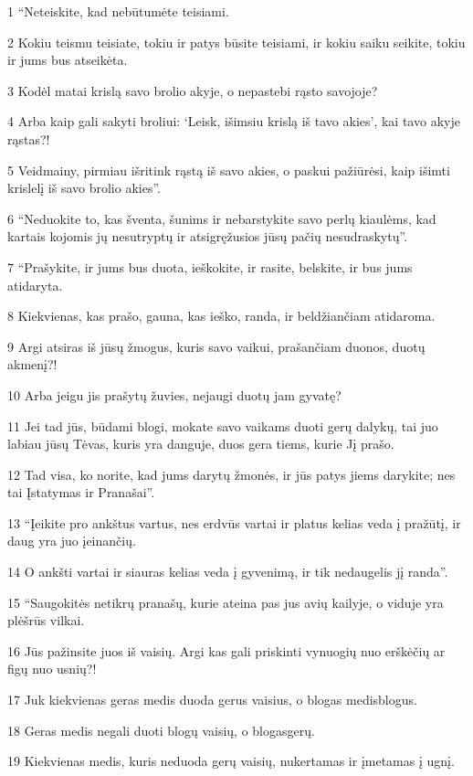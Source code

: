 \par 1 “Neteiskite, kad nebūtumėte teisiami. 
\par 2 Kokiu teismu teisiate, tokiu ir patys būsite teisiami, ir kokiu saiku seikite, tokiu ir jums bus atseikėta. 
\par 3 Kodėl matai krislą savo brolio akyje, o nepastebi rąsto savojoje? 
\par 4 Arba kaip gali sakyti broliui: ‘Leisk, išimsiu krislą iš tavo akies’, kai tavo akyje rąstas?! 
\par 5 Veidmainy, pirmiau išritink rąstą iš savo akies, o paskui pažiūrėsi, kaip išimti krislelį iš savo brolio akies”. 
\par 6 “Neduokite to, kas šventa, šunims ir nebarstykite savo perlų kiaulėms, kad kartais kojomis jų nesutryptų ir atsigręžusios jūsų pačių nesudraskytų”. 
\par 7 “Prašykite, ir jums bus duota, ieškokite, ir rasite, belskite, ir bus jums atidaryta. 
\par 8 Kiekvienas, kas prašo, gauna, kas ieško, randa, ir beldžiančiam atidaroma. 
\par 9 Argi atsiras iš jūsų žmogus, kuris savo vaikui, prašančiam duonos, duotų akmenį?! 
\par 10 Arba jeigu jis prašytų žuvies, nejaugi duotų jam gyvatę? 
\par 11 Jei tad jūs, būdami blogi, mokate savo vaikams duoti gerų dalykų, tai juo labiau jūsų Tėvas, kuris yra danguje, duos gera tiems, kurie Jį prašo. 
\par 12 Tad visa, ko norite, kad jums darytų žmonės, ir jūs patys jiems darykite; nes tai Įstatymas ir Pranašai”. 
\par 13 “Įeikite pro ankštus vartus, nes erdvūs vartai ir platus kelias veda į pražūtį, ir daug yra juo įeinančių. 
\par 14 O ankšti vartai ir siauras kelias veda į gyvenimą, ir tik nedaugelis jį randa”. 
\par 15 “Saugokitės netikrų pranašų, kurie ateina pas jus avių kailyje, o viduje yra plėšrūs vilkai. 
\par 16 Jūs pažinsite juos iš vaisių. Argi kas gali priskinti vynuogių nuo erškėčių ar figų nuo usnių?! 
\par 17 Juk kiekvienas geras medis duoda gerus vaisius, o blogas medis­blogus. 
\par 18 Geras medis negali duoti blogų vaisių, o blogas­gerų. 
\par 19 Kiekvienas medis, kuris neduoda gerų vaisių, nukertamas ir įmetamas į ugnį. 
